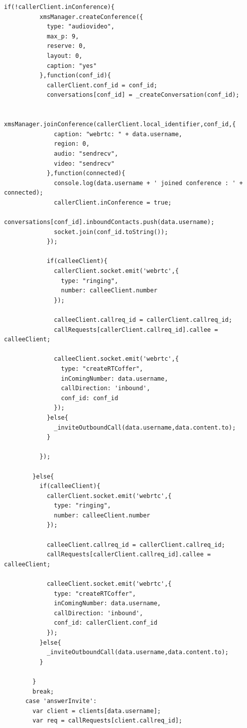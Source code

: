 \begin{appendices}
\begin{lstlisting}[caption={socket.js on Application Server},label={code:server_socket}]
        if(!callerClient.inConference){
          xmsManager.createConference({
            type: "audiovideo",
            max_p: 9,
            reserve: 0,
            layout: 0,
            caption: "yes"
          },function(conf_id){
            callerClient.conf_id = conf_id;
            conversations[conf_id] = _createConversation(conf_id);

            xmsManager.joinConference(callerClient.local_identifier,conf_id,{
              caption: "webrtc: " + data.username,
              region: 0,
              audio: "sendrecv",
              video: "sendrecv"
            },function(connected){
              console.log(data.username + ' joined conference : ' + connected);
              callerClient.inConference = true;
              conversations[conf_id].inboundContacts.push(data.username);
              socket.join(conf_id.toString());
            });

            if(calleeClient){
              callerClient.socket.emit('webrtc',{
                type: "ringing",
                number: calleeClient.number
              });

              calleeClient.callreq_id = callerClient.callreq_id;
              callRequests[callerClient.callreq_id].callee = calleeClient;

              calleeClient.socket.emit('webrtc',{
                type: "createRTCoffer",
                inComingNumber: data.username,
                callDirection: 'inbound',
                conf_id: conf_id
              });
            }else{
              _inviteOutboundCall(data.username,data.content.to);
            }   
            
          });

        }else{
          if(calleeClient){
            callerClient.socket.emit('webrtc',{
              type: "ringing",
              number: calleeClient.number
            });

            calleeClient.callreq_id = callerClient.callreq_id;
            callRequests[callerClient.callreq_id].callee = calleeClient;

            calleeClient.socket.emit('webrtc',{
              type: "createRTCoffer",
              inComingNumber: data.username,
              callDirection: 'inbound',
              conf_id: callerClient.conf_id
            });
          }else{
            _inviteOutboundCall(data.username,data.content.to);
          }
          
        }
        break;
      case 'answerInvite':
        var client = clients[data.username];
        var req = callRequests[client.callreq_id];


\end{lstlisting}
\end{appendices}
